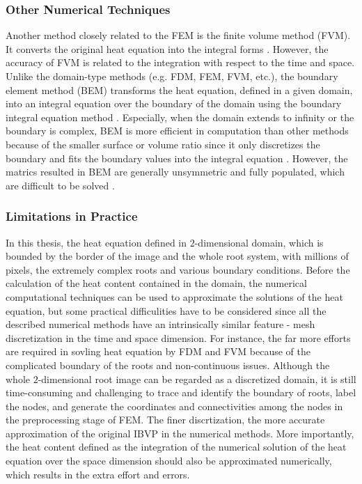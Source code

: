 \subsubsection{Other Numerical Techniques}


Another method closely related to the FEM is the finite volume method
(FVM). It converts the original heat equation into the integral
forms \cite{eymard2000finite}. However, the accuracy of FVM is related
to the integration with respect to the time and space. Unlike the
domain-type methods (e.g. FDM, FEM, FVM, etc.), the boundary element
method (BEM) transforms the heat equation, defined in a given domain,
into an integral equation over the boundary of the domain using the
boundary integral equation
method \cite{attaway1991boundary}. Especially, when the domain extends
to infinity or the boundary is complex, BEM is more efficient in
computation than other methods because of the smaller surface or
volume ratio \cite{katsikadelis2002boundary} since it only discretizes
the boundary and fits the boundary values into the integral
equation \cite{ang2007beginner}. However, the matrics resulted in BEM
are generally unsymmetric and fully populated, which are difficult to
be solved \cite{mushtaq2010advantages}.


\subsubsection{Limitations in Practice}



In this thesis, the heat equation defined in $2$-dimensional domain,
which is bounded by the border of the image and the whole root system,
with millions of pixels, the extremely complex roots and various
boundary conditions. Before the calculation of the heat content
contained in the domain, the numerical computational techniques can be
used to approximate the solutions of the heat equation, but some
practical difficulities have to be considered since all the described
numerical methods have an intrinsically similar feature - mesh
discretization in the time and space dimension. For instance, the far
more efforts are required in sovling heat equation by FDM and FVM
because of the complicated boundary of the roots and non-continuous
issues. Although the whole $2$-dimensional root image can be regarded
as a discretized domain, it is still time-consuming and challenging to
trace and identify the boundary of roots, label the nodes, and
generate the coordinates and connectivities among the nodes in the
preprocessing stage of FEM. The finer discrtization, the more accurate
approximation of the original IBVP in the numerical methods. More
importantly, the heat content defined as the integration of the
numerical solution of the heat equation over the space dimension
should also be approximated numerically, which results in the extra
effort and errors.
